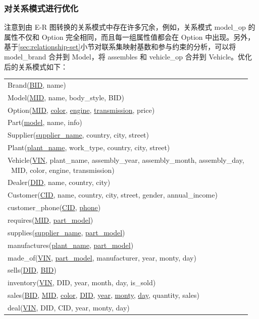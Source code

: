 \documentclass[hyperref,a4paper,UTF8]{ctexart}
\begin{document}
\subsubsection{对关系模式进行优化\label{sec:对关系模式进行优化}}

注意到由 E-R 图转换的关系模式中存在许多冗余，例如，关系模式 model\_op 的属性不仅和 Option 完全相同，而且每一组属性值都会在 Option 中出现。另外，基于\ref{sec:relationship-set}小节对联系集映射基数和参与约束的分析，可以将 model\_brand 合并到 Model，将 assembles 和 vehicle\_op 合并到 Vehicle。优化后的关系模式如下：

\begin{center}
    \begin{tabular}{l}
        Brand(\underline{BID}, name)\\
        Model(\underline{MID}, name, body\_style, BID)\\
        Option(\underline{MID}, \underline{color}, \underline{engine}, \underline{transmission}, price)\\
        Part(\underline{model}, name, info)\\
        Supplier(\underline{supplier\_name}, country, city, street)\\
        Plant(\underline{plant\_name}, work\_type, country, city, street)\\
        \makecell[l]{Vehicle(\underline{VIN}, plant\_name, assembly\_year, assembly\_month, assembly\_day, \\ \qquad \quad \  MID, color, engine, transmission)}\\
        Dealer(\underline{DID}, name, country, city)\\
        Customer(\underline{CID}, name, country, city, street, gender, annual\_income)\\
        customer\_phone(\underline{CID}, \underline{phone})\\
        requires(\underline{MID}, \underline{part\_model})\\
        supplies(\underline{supplier\_name}, \underline{part\_model})\\
        manufactures(\underline{plant\_name}, \underline{part\_model})\\
        made\_of(\underline{VIN}, \underline{part\_model}, manufacturer, year, monty, day)\\
        sells(\underline{DID}, \underline{BID})\\
        inventory(\underline{VIN}, DID, year, month, day, is\_sold)\\
        sales(\underline{BID}, \underline{MID}, \underline{color}, \underline{DID}, \underline{year}, \underline{monty}, \underline{day}, quantity, sales)\\
        deal(\underline{VIN}, DID, CID, year, monty, day)
    \end{tabular}
\end{center}
\end{document}
